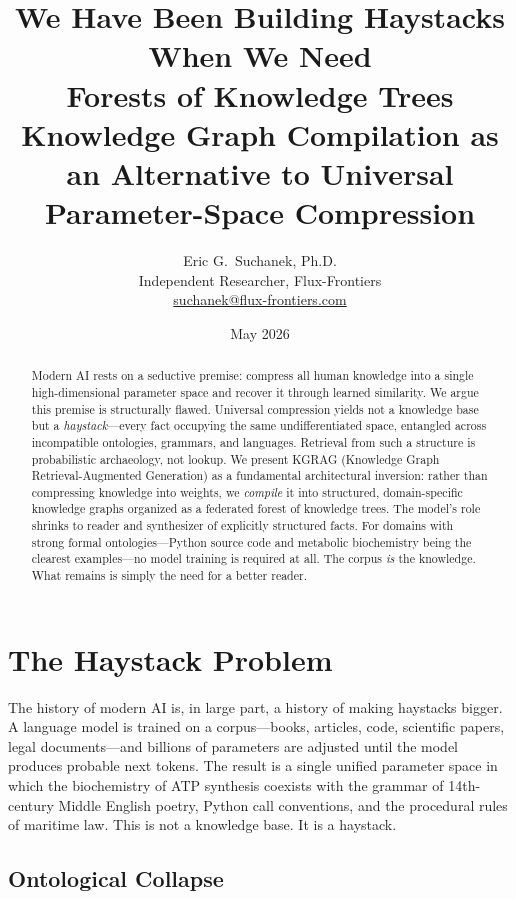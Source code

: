 \documentclass{article}
\title{\textbf{We Have Been Building Haystacks When We Need\\
Forests of Knowledge Trees}\\[0.5em]
\large Knowledge Graph Compilation as an Alternative to Universal\\Parameter-Space Compression}
\author{Eric G.\ Suchanek, Ph.D.\\
\small Independent Researcher, Flux-Frontiers\\
\small \href{mailto:suchanek@flux-frontiers.com}{suchanek@flux-frontiers.com}}
\date{May 2026}
\begin{document}
\maketitle

\begin{abstract}
Modern AI rests on a seductive premise: compress all human knowledge into a
single high-dimensional parameter space and recover it through learned
similarity.  We argue this premise is structurally flawed.  Universal
compression yields not a knowledge base but a \emph{haystack}---every fact
occupying the same undifferentiated space, entangled across incompatible
ontologies, grammars, and languages.  Retrieval from such a structure is
probabilistic archaeology, not lookup.  We present KGRAG (Knowledge Graph
Retrieval-Augmented Generation) as a fundamental architectural inversion:
rather than compressing knowledge into weights, we \emph{compile} it into
structured, domain-specific knowledge graphs organized as a federated forest of
knowledge trees.  The model's role shrinks to reader and synthesizer of
explicitly structured facts.  For domains with strong formal ontologies---Python
source code and metabolic biochemistry being the clearest examples---no model
training is required at all.  The corpus \emph{is} the knowledge.  What remains
is simply the need for a better reader.
\end{abstract}

\section{The Haystack Problem}

The history of modern AI is, in large part, a history of making haystacks
bigger.  A language model is trained on a corpus---books, articles, code,
scientific papers, legal documents---and billions of parameters are adjusted
until the model produces probable next tokens.  The result is a single unified
parameter space in which the biochemistry of ATP synthesis coexists with the
grammar of 14th-century Middle English poetry, Python call conventions, and the
procedural rules of maritime law.  This is not a knowledge base.  It is a
haystack.

\subsection{Ontological Collapse}
\end{document}
